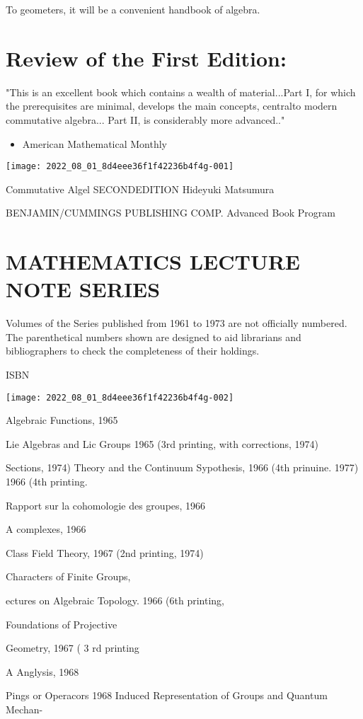 To geometers, it will be a convenient handbook of algebra.

\section{Review of the First Edition:}
"This is an excellent book which contains a wealth of material...Part I, for which the prerequisites are minimal, develops the main concepts, centralto modern commutative algebra... Part II, is considerably more advanced.."

\begin{itemize}
  \item American Mathematical Monthly
\end{itemize}
\texttt{[image: 2022\_08\_01\_8d4eee36f1f42236b4f4g-001]}

Commutative Algel SECONDEDITION Hideyuki Matsumura

BENJAMIN/CUMMINGS PUBLISHING COMP. Advanced Book Program

\section{MATHEMATICS LECTURE NOTE SERIES}
Volumes of the Series published from 1961 to 1973 are not officially numbered. The parenthetical numbers shown are designed to aid librarians and bibliographers to check the completeness of their holdings.

ISBN

\texttt{[image: 2022\_08\_01\_8d4eee36f1f42236b4f4g-002]}

Algebraic Functions, 1965

Lie Algebras and Lic Groups 1965 (3rd printing, with corrections, 1974)

Sections, 1974) Theory and the Continuum Sypothesis, 1966 (4th prinuine. 1977) 1966 (4th printing.

Rapport sur la cohomologie des groupes, 1966

A complexes, 1966

Class Field Theory, 1967 (2nd printing, 1974)

Characters of Finite Groups,

ectures on Algebraic Topology. 1966 (6th printing,

Foundations of Projective

Geometry, 1967 ( 3 rd printing

A Anglysis, 1968

Pings or Operacors 1968 Induced Representation of Groups and Quantum Mechan-

